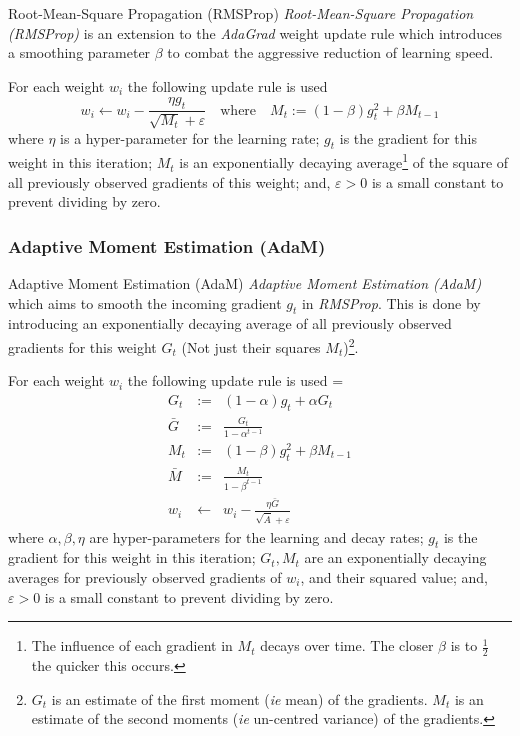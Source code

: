 \documentclass[11pt,a4paper]{article}
\begin{document}
  \begin{definition}{Root-Mean-Square Propagation (RMSProp)}
    \textit{Root-Mean-Square Propagation (RMSProp)} is an extension to the \textit{AdaGrad} weight update rule which introduces a smoothing parameter $\beta$ to combat the aggressive reduction of learning speed.
    \par For each weight $w_i$ the following update rule is used
    \[
      w_i\leftarrow w_i-\frac{\eta g_t}{\sqrt{M_t}+\varepsilon}\quad\text{where}\quad M_t:=(1-\beta) g_t^2+\beta M_{t-1}
    \]
    where $\eta$ is a hyper-parameter for the learning rate; $g_t$ is the gradient for this weight in this iteration; $M_t$ is an  exponentially decaying average\footnote{The influence of each gradient in $M_t$ decays over time. The closer $\beta$ is to $\frac12$ the quicker this occurs.} of the square of all previously observed gradients of this weight; and, $\varepsilon>0$ is a small constant to prevent dividing by zero.
  \end{definition}

\subsubsection{Adaptive Moment Estimation (AdaM)} \label{sec_AdaM}

  \begin{definition}{Adaptive Moment Estimation (AdaM)}
    \textit{Adaptive Moment Estimation (AdaM)} which aims to smooth the incoming gradient $g_t$ in \textit{RMSProp}. This is done by introducing an exponentially decaying average of all previously observed gradients for this weight $G_t$ (Not just their squares $M_t$)\footnote{$G_t$ is an estimate of the first moment (\textit{ie} mean) of the gradients. $M_t$ is an estimate of the second moments (\textit{ie} un-centred variance) of the gradients.}.
    \par For each weight $w_i$ the following update rule is used
    \everymath={\displaystyle}
    \[\begin{array}{rrl}
      G_t&:=&(1-\alpha)g_t+\alpha G_t\\
      \bar{G}&:=&\frac{G_t}{1-\alpha^{t-1}}\\
      M_t&:=&(1-\beta)g_t^2+\beta M_{t-1}\\
      \bar{M}&:=&\frac{M_t}{1-\beta^{t-1}}\\
      w_i&\leftarrow&w_i-\frac{\eta\bar{G}}{\sqrt{\bar{A}}+\varepsilon}
    \end{array}\]
    where $\alpha,\beta,\eta$ are hyper-parameters for the learning and decay rates; $g_t$ is the gradient for this weight in this iteration; $G_t,M_t$ are an exponentially decaying averages for previously observed gradients of $w_i$, and their squared value; and, $\varepsilon>0$ is a small constant to prevent dividing by zero.
  \end{definition}
\end{document}
